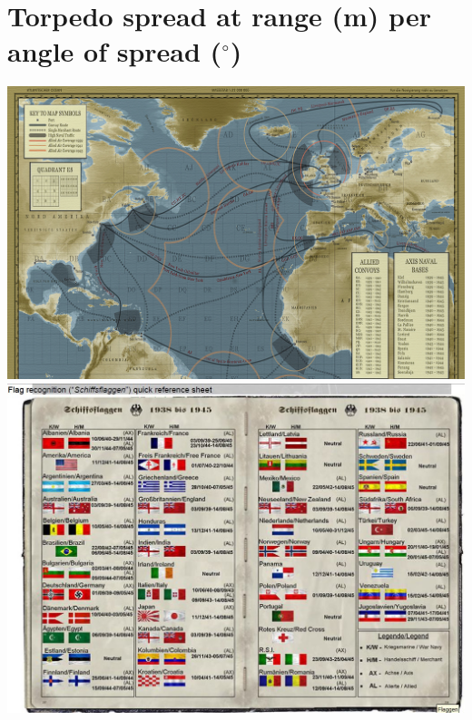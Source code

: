 \documentclass{article}
\newcommand{\degree}{$^{\circ}$}
\begin{document}
\pagebreak

\section{Torpedo spread at range (m) per angle of spread (\degree)}





\includegraphics[angle=90, width=\textwidth]{cmapETO}
\label{GWX Campaign Map}
\includegraphics[angle=90, width=\textwidth]{ETOFlags}
\end{document}
